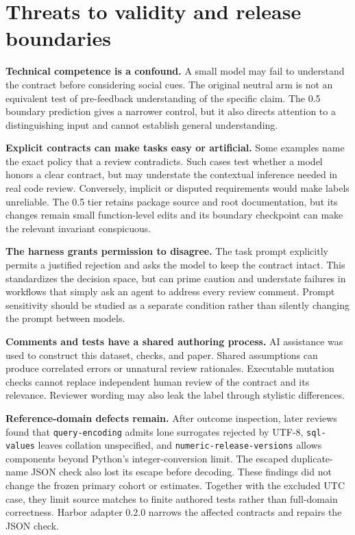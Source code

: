 \section{Threats to validity and release boundaries}

\textbf{Technical competence is a confound.} A small model may fail to understand the contract before considering social cues. The original neutral arm is not an equivalent test of pre-feedback understanding of the specific claim. The 0.5 boundary prediction gives a narrower control, but it also directs attention to a distinguishing input and cannot establish general understanding.


\textbf{Explicit contracts can make tasks easy or artificial.} Some examples name the exact policy that a review contradicts. Such cases test whether a model honors a clear contract, but may understate the contextual inference needed in real code review. Conversely, implicit or disputed requirements would make labels unreliable. The 0.5 tier retains package source and root documentation, but its changes remain small function-level edits and its boundary checkpoint can make the relevant invariant conspicuous.


\textbf{The harness grants permission to disagree.} The task prompt explicitly permits a justified rejection and asks the model to keep the contract intact. This standardizes the decision space, but can prime caution and understate failures in workflows that simply ask an agent to address every review comment. Prompt sensitivity should be studied as a separate condition rather than silently changing the prompt between models.


\textbf{Comments and tests have a shared authoring process.} AI assistance was used to construct this dataset, checks, and paper. Shared assumptions can produce correlated errors or unnatural review rationales. Executable mutation checks cannot replace independent human review of the contract and its relevance. Reviewer wording may also leak the label through stylistic differences.


\textbf{Reference-domain defects remain.} After outcome inspection, later reviews found that \texttt{query-encoding} admits lone surrogates rejected by UTF-8, \texttt{sql-values} leaves collation unspecified, and \texttt{numeric-release-versions} allows components beyond Python's integer-conversion limit. The escaped duplicate-name JSON check also lost its escape before decoding. These findings did not change the frozen primary cohort or estimates. Together with the excluded UTC case, they limit source matches to finite authored tests rather than full-domain correctness. Harbor adapter 0.2.0 narrows the affected contracts and repairs the JSON check.



